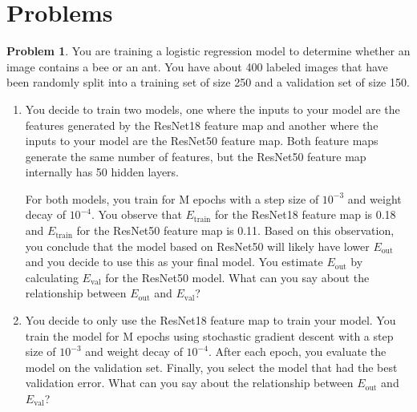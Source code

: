 \documentclass[10pt]{exam}
\theoremstyle{definition}
\newtheorem{problem}{Problem}
\newcommand{\Eout}{E_{\text{out}}}
\newcommand{\Etrain}{E_{\text{train}}}
\newcommand{\Eval}{E_{\text{val}}}
\begin{document}
\section*{Problems}
\begin{problem}
    You are training a logistic regression model to determine whether an image contains a bee or an ant.
    You have about 400 labeled images that have been randomly split into a training set of size 250 and a validation set of size 150.

    \begin{enumerate}
        \item 
            You decide to train two models, one where the inputs to your model are the features generated by the ResNet18 feature map and another where the inputs to your model are the ResNet50 feature map.
            Both feature maps generate the same number of features,
            but the ResNet50 feature map internally has 50 hidden layers.

            For both models, you train for M epochs with a step size of $10^{-3}$ and weight decay of $10^{-4}$.
            You observe that $\Etrain$ for the ResNet18 feature map is 0.18 and $\Etrain$ for the ResNet50 feature map is 0.11.
            Based on this observation, you conclude that the model based on ResNet50 will likely have lower $\Eout$ and you decide to use this as your final model.
            You estimate $\Eout$ by calculating $\Eval$ for the ResNet50 model.
            What can you say about the relationship between $\Eout$ and $\Eval$?


            \vspace{3in}
        \item
            You decide to only use the ResNet18 feature map to train your model.
            You train the model for M epochs using stochastic gradient descent with a step size of $10^{-3}$ and weight decay of $10^{-4}$.
            After each epoch, you evaluate the model on the validation set.
            Finally, you select the model that had the best validation error.
            What can you say about the relationship between $\Eout$ and $\Eval$?
    \end{enumerate}
\end{problem}
\end{document}

